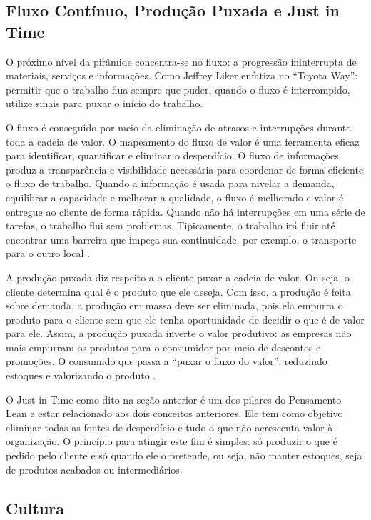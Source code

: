 \begin{anexosenv}
\subsection[Fluxo Contínuo, Produção Puxada e Just in Time]{Fluxo Contínuo, Produção Puxada e Just in Time}

O próximo nível da pirâmide concentra-se no fluxo: a progressão ininterrupta de materiais, serviços e informações.  Como Jeffrey Liker enfatiza no “Toyota Way”: permitir que o trabalho flua sempre que puder, quando o fluxo é interrompido, utilize sinais para puxar o início do trabalho.

O fluxo é conseguido por meio da eliminação de atrasos e interrupções durante toda a cadeia de valor. O mapeamento do fluxo de valor é uma ferramenta eficaz para identificar, quantificar e eliminar o desperdício. O fluxo de informações produz a transparência e visibilidade necessária para coordenar de forma eficiente o fluxo de trabalho. Quando a informação é usada para nivelar a demanda, equilibrar a capacidade e melhorar a qualidade, o fluxo é melhorado e valor é entregue ao cliente de forma rápida. Quando não há interrupções em uma série de tarefas, o trabalho flui sem problemas. Tipicamente, o trabalho irá fluir até encontrar uma barreira que impeça sua continuidade, por exemplo, o transporte para o outro local \cite{bell2011}. 

A produção puxada diz respeito a o cliente puxar a cadeia de valor. Ou seja, o cliente determina qual é o produto que ele deseja. Com isso, a produção é feita sobre demanda, a produção em massa deve ser eliminada, pois ela empurra o produto para o cliente sem que ele tenha oportunidade de decidir o que é de valor para ele. Assim, a produção puxada inverte o valor produtivo: as empresas não mais empurram os produtos para o consumidor por meio de descontos e promoções. O consumido que passa a “puxar o fluxo do valor”, reduzindo estoques e valorizando o produto \cite{bell2011}.

O Just in Time como dito na seção anterior é um dos pilares do Pensamento Lean e estar relacionado aos dois conceitos anteriores. Ele tem como objetivo eliminar todas as fontes de desperdício e tudo o que não acrescenta valor à organização. O princípio para atingir este fim é simples: só produzir o que é pedido pelo cliente e só quando ele o pretende, ou seja, não manter estoques, seja de produtos acabados ou intermediários. 

\subsection[Cultura]{Cultura}


\end{anexosenv}
